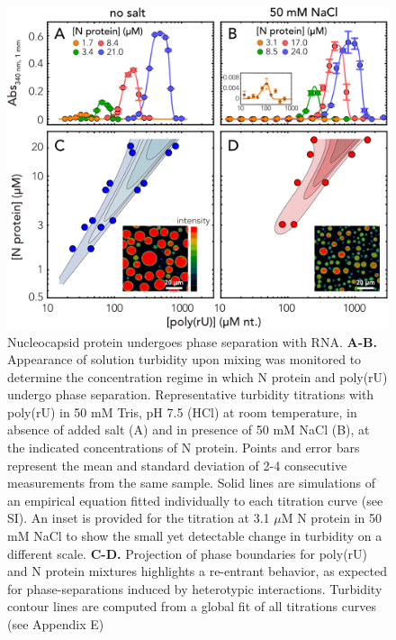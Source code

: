 \documentclass[../main.tex]{subfiles}
\begin{document}
        \begin{figure}[!htb] %
            \centering
            \includegraphics[width=5.5in]{ch6-fig5.png}
            \caption[Nucleocapsid protein undergoes phase separation with RNA]
                {Nucleocapsid protein undergoes phase separation with RNA. \textbf{A-B.} Appearance of solution turbidity upon mixing was monitored to determine the concentration regime in which N protein and poly(rU) undergo phase separation. Representative turbidity titrations with poly(rU) in 50 mM Tris, pH 7.5 (HCl) at room temperature, in absence of added salt (A) and in presence of 50 mM NaCl (B), at the indicated concentrations of N protein. Points and error bars represent the mean and standard deviation of 2-4 consecutive measurements from the same sample. Solid lines are simulations of an empirical equation fitted individually to each titration curve (see SI). An inset is provided for the titration at 3.1 $\mu$M N protein in 50 mM NaCl to show the small yet detectable change in turbidity on a different scale. \textbf{C-D.} Projection of phase boundaries for poly(rU) and N protein mixtures highlights a re-entrant behavior, as expected for phase-separations induced by heterotypic interactions. Turbidity contour lines are computed from a global fit of all titrations curves (see Appendix E)}
            \label{fig:ch6-fig5}
        \end{figure}
\end{document}
